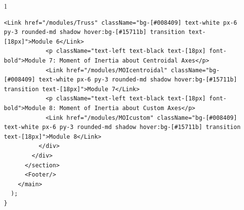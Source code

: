 \begin{spacing}{1}
\begin{Verbatim}[breaklines=true, breaksymbolleft={}, breaksymbolright={}]
            <Link href="/modules/Truss" className="bg-[#008409] text-white px-6 py-3 rounded-md shadow hover:bg-[#15711b] transition text-[18px]">Module 6</Link>
            <p className="text-left text-black text-[18px] font-bold">Module 7: Moment of Inertia about Centroidal Axes</p>
            <Link href="/modules/MOIcentroidal" className="bg-[#008409] text-white px-6 py-3 rounded-md shadow hover:bg-[#15711b] transition text-[18px]">Module 7</Link>
            <p className="text-left text-black text-[18px] font-bold">Module 8: Moment of Inertia about Custom Axes</p>
            <Link href="/modules/MOIcustom" className="bg-[#008409] text-white px-6 py-3 rounded-md shadow hover:bg-[#15711b] transition text-[18px]">Module 8</Link>
          </div>
        </div>
      </section>
      <Footer/>
    </main>
  );
}
\end{Verbatim}
\end{spacing}

